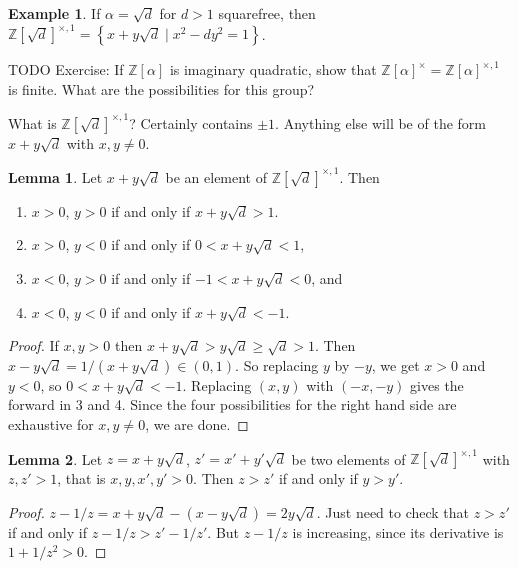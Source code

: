 \documentclass{article}
\newcommand{\Z}{\mathbb{Z}}
\newcommand{\rb}[1]{\left( #1 \right)}
\renewcommand{\sb}[1]{\left[ #1 \right]}
\newcommand{\cb}[1]{\left\{ #1 \right\}}
\theoremstyle{definition}\newtheorem{definition}{Definition}
\theoremstyle{definition}\newtheorem*{remark}{Remark}
\theoremstyle{definition}\newtheorem*{example}{Example}
\theoremstyle{definition}\newtheorem*{note}{Note}
\newtheorem{lemma}[definition]{Lemma}
\begin{document}
\begin{example}
If $ \alpha = \sqrt{d} $ for $ d > 1 $ squarefree, then $ \Z\sb{\sqrt{d}}^{\times, 1} = \cb{x + y\sqrt{d} \mid x^2 - dy^2 = 1} $.
\end{example}

TODO Exercise: If $ \Z\sb{\alpha} $ is imaginary quadratic, show that $ \Z\sb{\alpha}^\times = \Z\sb{\alpha}^{\times, 1} $ is finite. What are the possibilities for this group?

What is $ \Z\sb{\sqrt{d}}^{\times, 1} $? Certainly contains $ \pm 1 $. Anything else will be of the form $ x + y\sqrt{d} $ with $ x, y \ne 0 $.

\begin{lemma}
Let $ x + y\sqrt{d} $ be an element of $ \Z\sb{\sqrt{d}}^{\times, 1} $. Then
\begin{enumerate}
\item $ x > 0 $, $ y > 0 $ if and only if $ x + y\sqrt{d} > 1 $.
\item $ x > 0 $, $ y < 0 $ if and only if $ 0 < x + y\sqrt{d} < 1 $,
\item $ x < 0 $, $ y > 0 $ if and only if $ -1 < x + y\sqrt{d} < 0 $, and
\item $ x < 0 $, $ y < 0 $ if and only if $ x + y\sqrt{d} < -1 $.
\end{enumerate}
\end{lemma}

\begin{proof}
If $ x, y > 0 $ then $ x + y\sqrt{d} > y\sqrt{d} \ge \sqrt{d} > 1 $. Then $ x - y\sqrt{d} = 1 / \rb{x + y\sqrt{d}} \in \rb{0, 1} $. So replacing $ y $ by $ -y $, we get $ x > 0 $ and $ y < 0 $, so $ 0 < x + y\sqrt{d} < -1 $. Replacing $ \rb{x, y} $ with $ \rb{-x, -y} $ gives the forward in 3 and 4. Since the four possibilities for the right hand side are exhaustive for $ x, y \ne 0 $, we are done.
\end{proof}

\begin{lemma}
Let $ z = x + y\sqrt{d} $, $ z' = x' + y'\sqrt{d} $ be two elements of $ \Z\sb{\sqrt{d}}^{\times, 1} $ with $ z, z' > 1 $, that is $ x, y, x', y' > 0 $. Then $ z > z' $ if and only if $ y > y' $.
\end{lemma}

\begin{proof}
$ z - 1 / z = x + y\sqrt{d} - \rb{x - y\sqrt{d}} = 2y\sqrt{d} $. Just need to check that $ z > z' $ if and only if $ z - 1 / z > z' - 1 / z' $. But $ z - 1 / z $ is increasing, since its derivative is $ 1 + 1 / z^2 > 0 $.
\end{proof}
\end{document}
